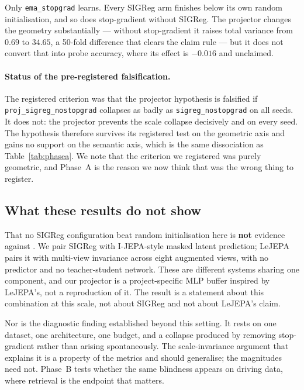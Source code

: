 \ours{} Only \texttt{ema\_stopgrad} learns. Every SIGReg arm finishes below its own random
initialisation, and so does stop-gradient without SIGReg. The projector changes the geometry
substantially --- without stop-gradient it raises total variance from $0.69$ to $34.65$, a
50-fold difference that clears the claim rule --- but it does not convert that into probe
accuracy, where its effect is $-0.016$ and unclaimed.

\paragraph{Status of the pre-registered falsification.} The registered criterion was that
the projector hypothesis is falsified if \texttt{proj\_sigreg\_nostopgrad} collapses as
badly as \texttt{sigreg\_nostopgrad} on all seeds. It does not: the projector prevents the
scale collapse decisively and on every seed. \ours{} The hypothesis therefore survives its
registered test on the geometric axis and gains no support on the semantic axis, which is
the same dissociation as Table~\ref{tab:phasea}. \interp{} We note that the criterion we
registered was purely geometric, and Phase~A is the reason we now think that was the wrong
thing to register.

\subsection{What these results do not show}

\interp{} That no SIGReg configuration beat random initialisation here is \textbf{not}
evidence against \citet{lejepa2025}. We pair SIGReg with I-JEPA-style masked latent
prediction; LeJEPA pairs it with multi-view invariance across eight augmented views, with no
predictor and no teacher-student network. These are different systems sharing one component,
and our projector is a project-specific MLP buffer inspired by LeJEPA's, not a reproduction
of it. The result is a statement about this combination at this scale, not about SIGReg and
not about LeJEPA's claim.

\interp{} Nor is the diagnostic finding established beyond this setting. It rests on one
dataset, one architecture, one budget, and a collapse produced by removing stop-gradient
rather than arising spontaneously. The scale-invariance argument that explains it is a
property of the metrics and should generalise; the magnitudes need not. Phase~B tests
whether the same blindness appears on driving data, where retrieval is the endpoint that
matters.
